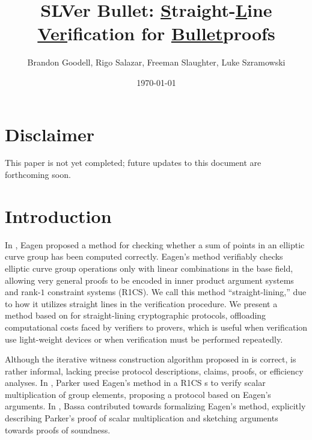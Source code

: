 \documentclass[11pt,letterpaper]{article}
\title{
SLVer Bullet: \underline{S}traight-\underline{L}ine \underline{Ver}ification for \underline{Bullet}proofs
}
\author{Brandon Goodell, Rigo Salazar, Freeman Slaughter, Luke Szramowski
}
\affil{$\mathsf{Cypher \ Stack}$}
\date{\today}
\newcommand{\free}[1]{{\textcolor{red}{#1}}}
\theoremstyle{definition}
\newcommand{\6}{\mathbf}
\newcommand{\7}{\mathcal}
\begin{document}
\maketitle


\section*{Disclaimer}

This paper is not yet completed; future updates to this document are forthcoming soon.

\section{Introduction}


In \cite{Eagen}, Eagen proposed a method for checking whether a sum of points in an elliptic curve group has been computed correctly. Eagen's method verifiably checks elliptic curve group operations only with linear combinations in the base field, allowing very general proofs to be encoded in inner product argument systems and rank-$1$ constraint systems (R1CS). We call this method ``straight-lining,'' due to how it utilizes straight lines in the verification procedure.
We present a method based on \cite{Eagen} for straight-lining  cryptographic protocols, offloading computational costs faced by verifiers to provers, which is useful when verification use light-weight devices or when verification must be performed repeatedly.


Although the iterative witness construction algorithm proposed in \cite{Eagen} is correct, \cite{Eagen} is rather informal, lacking precise protocol descriptions, claims, proofs, or efficiency analyses. In \cite{Kayaba}, Parker used Eagen's method in a R1CS s to verify  scalar multiplication of group elements, proposing a protocol based on Eagen's arguments. In \cite{SoundnessForDLP}, Bassa contributed towards formalizing Eagen's method, explicitly describing Parker's proof of scalar multiplication and sketching arguments towards proofs of soundness.

\end{document}
